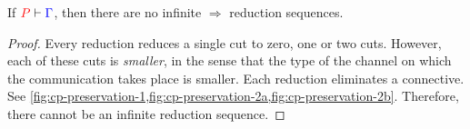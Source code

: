 \begin{theorem}[Termination]\label{thm:cp-termination}
  If $\seq[{ P }]{ \Gamma }$, then there are no infinite $\Longrightarrow$
  reduction sequences.
\end{theorem}
\begin{proof}
  Every reduction reduces a single cut to zero, one or two cuts.
  However, each of these cuts is \emph{smaller}, in the sense that the type of
  the channel on which the communication takes place is smaller.
  Each reduction eliminates a connective.
  See \cref{fig:cp-preservation-1,fig:cp-preservation-2a,fig:cp-preservation-2b}.
  Therefore, there cannot be an infinite reduction sequence.
\end{proof}
